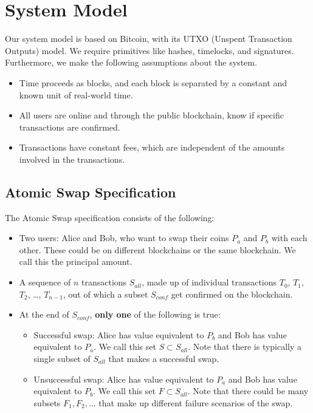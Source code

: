 \section{System Model}
Our system model is based on Bitcoin, with its UTXO (Unspent Transaction Outputs) model. We require primitives like hashes, timelocks, and signatures. Furthermore, we make the following assumptions about the system.
\begin{itemize}
    \item Time proceeds as blocks, and each block is separated by a constant and known unit of real-world time.
    \item All users are online and through the public blockchain, know if specific transactions are confirmed.
    \item Transactions have constant fees, which are independent of the amounts involved in the transactions.
\end{itemize}
\subsection{Atomic Swap Specification} \label{spec}
The Atomic Swap specification consists of the following:
\begin{itemize}
    \item Two users: Alice and Bob, who want to swap their coins $P_a$ and $P_b$ with each other. These could be on different blockchains or the same blockchain. We call this the principal amount.
    \item A sequence of $n$ transactions $S_{all}$, made up of individual transactions $T_0$, $T_1$, $T_2$, \ldots, $T_{n-1}$, out of which a subset $S_{conf}$ get confirmed on the blockchain.
    \item At the end of $S_{conf}$, \textbf{only one} of the following is true:
    \begin{itemize}
        \item Successful swap: Alice has value equivalent to $P_b$ and Bob has value equivalent to $P_a$. We call this set $S \subset S_{all}$. Note that there is typically a single subset of $S_{all} $ that makes a successful swap.
        \item Unsuccessful swap: Alice has value equivalent to $P_a$ and Bob has value equivalent to $P_b$. We call this set $F \subset S_{all}$. Note that there could be many subsets $F_1, F_2, \ldots$ that make up different failure scenarios of the swap.
    \end{itemize}
\end{itemize}

